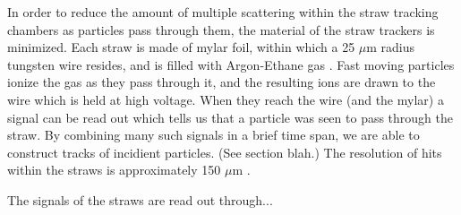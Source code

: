 In order to reduce the amount of multiple scattering within the straw tracking chambers as particles pass through them, the material of the straw trackers is minimized. Each straw is made of mylar foil, within which a 25 $\mu$m radius tungsten wire resides, and is filled with Argon-Ethane gas \cite{something}. Fast moving particles ionize the gas as they pass through it, and the resulting ions are drawn to the wire which is held at high voltage. When they reach the wire (and the mylar) a signal can be read out which tells us that a particle was seen to pass through the straw. By combining many such signals in a brief time span, we are able to construct tracks of incidient particles. (See section blah.) The resolution of hits within the straws is approximately 150 $\mu$m \cite{something}.

The signals of the straws are read out through...


